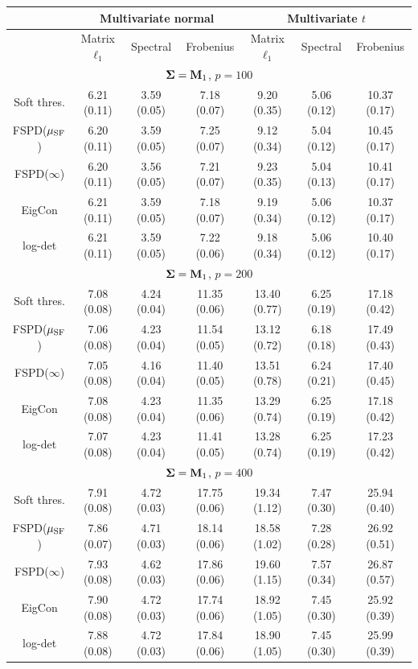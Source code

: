 \documentclass[times,sort&compress,3p]{elsarticle}
\begin{document}
\begin{table}[htb!]
{
\begin{center}
\begin{tabular}{c|ccc|ccc}
\hline
 & \multicolumn{3}{c|}{ Multivariate normal } &
 	\multicolumn{3}{c}{ Multivariate $t$  }\\
\hline
 & Matrix $\ell_1$ & Spectral & Frobenius & Matrix $\ell_1$ & Spectral & Frobenius \\
\hline
\multicolumn{7}{c}{${\bf \Sigma} = {\bf M}_1$, $p = 100$} \\
Soft thres. & 6.21 (0.11)  & 3.59 (0.05)  & 7.18 (0.07) & 9.20 (0.35)  & 5.06 (0.12)  & 10.37 (0.17) \\
 FSPD($\mu_{\rm SF}$) & 6.20 (0.11)  & 3.59 (0.05)  & 7.25 (0.07) & 9.12 (0.34)  & 5.04 (0.12)  & 10.45 (0.17) \\
 FSPD($\infty$) & 6.20 (0.11)  & 3.56 (0.05)  & 7.21 (0.07) & 9.23 (0.35)  & 5.04 (0.13)  & 10.41 (0.17) \\
 EigCon & 6.21 (0.11)  & 3.59 (0.05)  & 7.18 (0.07) & 9.19 (0.34)  & 5.06 (0.12)  & 10.37 (0.17) \\
 log-det  & 6.21 (0.11)  & 3.59 (0.05)  & 7.22 (0.06) & 9.18 (0.34)  & 5.06 (0.12)  & 10.40 (0.17) \\
\multicolumn{7}{c}{${\bf \Sigma} = {\bf M}_1$, $p = 200$} \\
Soft thres. & 7.08 (0.08)  & 4.24 (0.04)  & 11.35 (0.06) & 13.40 (0.77)  & 6.25 (0.19)  & 17.18 (0.42) \\
 FSPD($\mu_{\rm SF}$) & 7.06 (0.08)  & 4.23 (0.04)  & 11.54 (0.05) & 13.12 (0.72)  & 6.18 (0.18)  & 17.49 (0.43) \\
 FSPD($\infty$) & 7.05 (0.08)  & 4.16 (0.04)  & 11.40 (0.05) & 13.51 (0.78)  & 6.24 (0.21)  & 17.40 (0.45) \\
 EigCon & 7.08 (0.08)  & 4.23 (0.04)  & 11.35 (0.06) & 13.29 (0.74)  & 6.25 (0.19)  & 17.18 (0.42) \\
 log-det  & 7.07 (0.08)  & 4.23 (0.04)  & 11.41 (0.05) & 13.28 (0.74)  & 6.25 (0.19)  & 17.23 (0.42) \\
\multicolumn{7}{c}{${\bf \Sigma} = {\bf M}_1$, $p = 400$} \\
Soft thres. & 7.91 (0.08)  & 4.72 (0.03)  & 17.75 (0.06) & 19.34 (1.12)  & 7.47 (0.30)  & 25.94 (0.40) \\
 FSPD($\mu_{\rm SF}$) & 7.86 (0.07)  & 4.71 (0.03)  & 18.14 (0.06) & 18.58 (1.02)  & 7.28 (0.28)  & 26.92 (0.51) \\
 FSPD($\infty$) & 7.93 (0.08)  & 4.62 (0.03)  & 17.86 (0.06) & 19.60 (1.15)  & 7.57 (0.34)  & 26.87 (0.57) \\
 EigCon & 7.90 (0.08)  & 4.72 (0.03)  & 17.74 (0.06) & 18.92 (1.05)  & 7.45 (0.30)  & 25.92 (0.39) \\
 log-det  & 7.88 (0.08)  & 4.72 (0.03)  & 17.84 (0.06) & 18.90 (1.05)  & 7.45 (0.30)  & 25.99 (0.39) \\
\hline


\end{tabular}
\end{center}}
\end{table}
\end{document}
